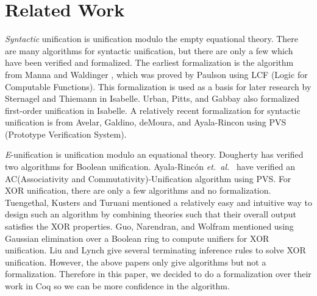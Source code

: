 \section{Related Work}
\emph{Syntactic} unification is unification modulo the empty
equational theory. There are many algorithms for syntactic unification, but there are
only a few which have been verified and formalized. The earliest formalization
is the algorithm from Manna and Waldinger \cite{manna1983deductive}, which was proved by Paulson \cite{paulson1985verifying} using LCF (Logic for Computable Functions). 
This formalization is used as a basis for later research by Sternagel and Thiemann 
\cite{FirstOrderTermsAFP} in Isabelle. 
Urban, Pitts, and Gabbay \cite{urban2004nominal} also formalized first-order unification in Isabelle. 
A relatively recent formalization for syntactic unification is from Avelar, Galdino, deMoura, and
Ayala-Rincon \cite{avelar2014first} using PVS (Prototype Verification System).

\emph{E}-unification is unification modulo an equational theory.
Dougherty \cite{dougherty2019coq} has verified two algorithms for Boolean 
unification.  Ayala-Rinc{\'o}n \emph{et.\ al.}\ \cite{ayala2022certified} have
verified an AC(Associativity and Commutativity)-Unification algorithm using
PVS. For XOR unification, there are only a
few algorithms and no formalization. 
Tuengethal, Kusters and Turuani  \cite{tuengerthal2006implementing}
mentioned a relatively easy and intuitive way to design such an
algorithm by combining theories such that their overall output
satisfies the XOR properties. 
Guo, Narendran, and Wolfram \cite{guo1996unification} mentioned using Gaussian 
elimination over a Boolean ring to compute unifiers for XOR
unification. %
Liu and Lynch \cite{liu2011efficient}
give several terminating inference rules to solve XOR unification.  %
However, the above papers only give algorithms but not a formalization. Therefore 
in this paper, we decided to do a formalization over their work in Coq so we can be more confidence in the algorithm.